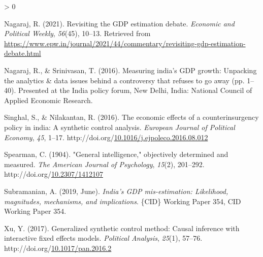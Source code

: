 \documentclass[12pt,nobind, a4paper]{reedthesis}
\newlength{\cslhangindent}
\newenvironment{CSLReferences}[2] %
{%
	\setlength{\parindent}{0pt}
	\ifodd #1 \everypar{\setlength{\hangindent}{\cslhangindent}}\ignorespaces\fi
	\ifnum #2 > 0
	\setlength{\parskip}{#2\baselineskip}
	\fi
}%
{}
\begin{document}
\begin{CSLReferences}{1}{0}
 \leavevmode\hypertarget{ref-nagaraj_revisiting_2021}{}%
 Nagaraj, R. (2021). Revisiting the {GDP} estimation debate. \emph{Economic and Political Weekly}, \emph{56}(45), 10--13. Retrieved from \url{https://www.epw.in/journal/2021/44/commentary/revisiting-gdp-estimation-debate.html}

 \leavevmode\hypertarget{ref-nagaraj_measuring_2016}{}%
 Nagaraj, R., \& Srinivasan, T. (2016). Measuring india's {GDP} growth: Unpacking the analytics \& data issues behind a controversy that refuses to go away (pp. 1--40). Presented at the India policy forum, New Delhi, India: National Council of Applied Economic Research.

 \leavevmode\hypertarget{ref-singhal_economic_2016}{}%
 Singhal, S., \& Nilakantan, R. (2016). The economic effects of a counterinsurgency policy in india: A synthetic control analysis. \emph{European Journal of Political Economy}, \emph{45}, 1--17. http://doi.org/\href{https://doi.org/10.1016/j.ejpoleco.2016.08.012}{10.1016/j.ejpoleco.2016.08.012}

 \leavevmode\hypertarget{ref-spearman_general_1904}{}%
 Spearman, C. (1904). "General intelligence," objectively determined and measured. \emph{The American Journal of Psychology}, \emph{15}(2), 201--292. http://doi.org/\href{https://doi.org/10.2307/1412107}{10.2307/1412107}

 \leavevmode\hypertarget{ref-subramanian_indias_2019}{}%
 Subramanian, A. (2019, June). \emph{India's {GDP} mis-estimation: Likelihood, magnitudes, mechanisms, and implications}. \{CID\} Working Paper 354, {CID} Working Paper 354.

 \leavevmode\hypertarget{ref-xu_generalized_2017}{}%
 Xu, Y. (2017). Generalized synthetic control method: Causal inference with interactive fixed effects models. \emph{Political Analysis}, \emph{25}(1), 57--76. http://doi.org/\href{https://doi.org/10.1017/pan.2016.2}{10.1017/pan.2016.2}

 \end{CSLReferences}
	
	
\end{document}
